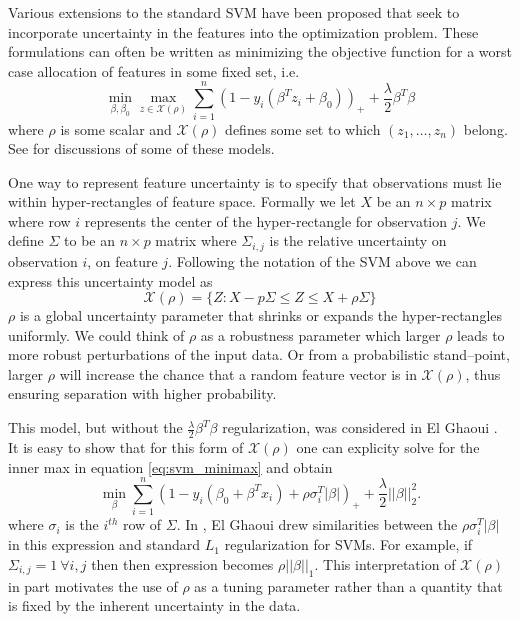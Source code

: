 \documentclass[10pt]{article}
\theoremstyle{definition}
\begin{document}
Various extensions to the standard SVM have been proposed that seek to incorporate uncertainty in the features into the optimization problem. These formulations can often be written as minimizing the objective function for a worst case allocation of features in some fixed set, i.e.
\begin{equation}
\label{eq:svm_minimax}
\min_{\beta,\beta_0}  \max_{z \in \mathcal{X}(\rho)} \sum_{i=1}^n (1 - y_i(\beta^Tz_i + \beta_0))_{+} + \frac{\lambda}{2}\beta^T\beta
\end{equation}
where $\rho$ is some scalar and $\mathcal{X}(\rho)$ defines some set to which $(z_1, \ldots, z_n)$ belong. See \cite{bhattacharyya2004robust,shivaswamy2006second,ben2011chance} for discussions of some of these models.

One way to represent feature uncertainty is to specify that observations must lie within hyper-rectangles of feature space. Formally we let $X$ be an $n \times p$ matrix where row $i$ represents the center of the hyper-rectangle for observation $j$. We define $\Sigma$ to be an $n \times p$ matrix where $\Sigma_{i,j}$ is the relative uncertainty on observation $i$, on feature $j$. Following the notation of the SVM above we can express this uncertainty model as
\begin{equation}
\mathcal{X}(\rho) = \{Z : X - p\Sigma \leq Z \leq X + \rho \Sigma\}
\end{equation}
$\rho$ is a global uncertainty parameter that shrinks or expands the hyper-rectangles uniformly. We could think of $\rho$ as a robustness parameter which larger $\rho$ leads to more robust perturbations of the input data. Or from a probabilistic stand--point, larger $\rho$ will increase the chance that a random feature vector is in $\mathcal{X}(\rho)$, thus ensuring separation with higher probability.

This model, but without the $\frac{\lambda}{2}\beta^T\beta$ regularization, was considered in El Ghaoui \cite{el2003robust}. It is easy to show that for this form of $\mathcal{X}(\rho)$ one can explicity solve for the inner max in equation \eqref{eq:svm_minimax} and obtain
\begin{equation}
\label{eq:svmInit}
\min_{\beta}\sum_{i=1}^n(1-y_i(\beta_0+\beta^Tx_i)+\rho\sigma_i^T|\beta|)_++\frac{\lambda}{2} ||\beta||_2^2.
\end{equation}
where $\sigma_i$ is the $i^{th}$ row of $\Sigma$. In \cite{el2003robust}, El Ghaoui drew similarities between the $\rho\sigma_i^T|\beta|$ in this expression and standard $L_1$ regularization for SVMs. For example, if $\Sigma_{i,j} = 1 \ \forall i,j$ then then expression becomes $\rho||\beta||_1$. This interpretation of $\mathcal{X}(\rho)$ in part motivates the use of $\rho$ as a tuning parameter rather than a quantity that is fixed by the inherent uncertainty in the data.
\end{document}
